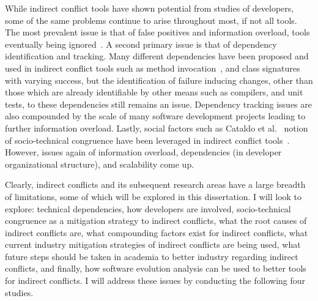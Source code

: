 While indirect conflict tools have shown potential from studies of developers, some of the same problems continue
to arise throughout most, if not all tools. The most prevalent issue is that of false positives and information
overload, tools eventually being
ignored~\cite{Sarma:2007:TSA, Servant:2010:CPI}. A second primary issue is that of dependency identification and
tracking. Many different dependencies have been proposed and used in indirect conflict tools such as method 
invocation~\cite{Trainer:2005:BGT}, and class signatures~\cite{Sarma:2007:TSA} with varying success, but the 
identification of failure inducing changes, other than those which are already identifiable by other means such
as compilers, and unit tests, to these dependencies still remains an issue. Dependency tracking issues are
also compounded by the scale of many software development projects leading to further information overload.
Lastly, social factors such as Cataldo et al.~\cite{Cataldo:2006:ICR} notion of socio-technical
congruence have been leveraged in indirect conflict tools~\cite{Kwan:2011:ESC, Begel:2010:CDE, Borici:2012:CHA}.
However, issues again of information overload, dependencies (in developer organizational structure), and scalability 
come up.

Clearly, indirect conflicts and its subsequent research areas have a large breadth of limitations, some of which
will be explored in this dissertation. I will look to explore: technical dependencies, how developers are involved,
socio-technical congruence as a mitigation strategy to indirect conflicts, what the root causes of indirect conflicts are,
what compounding factors exist for indirect conflicts, what current industry mitigation strategies of indirect conflicts
are being used, what future steps should be taken in academia to better industry regarding indirect conflicts, and finally,
how software evolution analysis can be used to better tools for indirect conflicts. I will address these issues by
conducting the following four studies.

